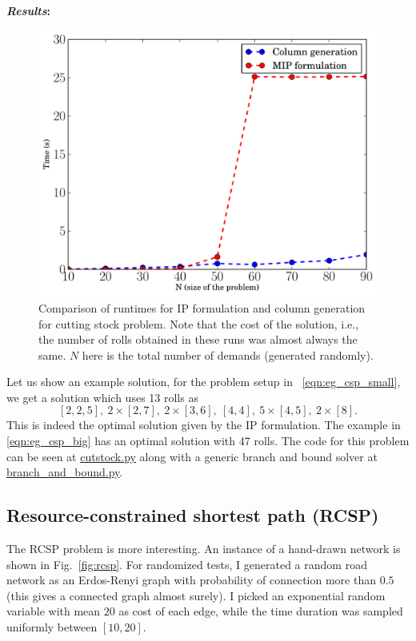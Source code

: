 \documentclass[letterpaper, 10pt, twocolumn, reqno]{amsart}
\begin{document}
\textbf{\emph{Results}:}
\begin{figure}
\centering
\includegraphics[width=0.9 \columnwidth]{colgen_results}
\caption{Comparison of runtimes for IP formulation and column generation for cutting stock problem. Note that the cost of the solution, i.e., the number of
rolls obtained in these runs was almost always the same. $N$ here is the total number of demands (generated randomly).}
\label{fig:csp_average_runtime}
\end{figure}

Let us show an example solution, for the problem setup in ~\eqref{eqn:eg_csp_small}, we get a solution which uses 13 rolls as
$$
[2,2,5],\ 2\times [2,7],\ 2 \times [3,6],\ [4,4],\ 5 \times [4,5],\ 2\times [8].
$$
This is indeed the optimal solution given by the IP formulation. The example in \eqref{eqn:eg_csp_big} has an optimal solution with 47 rolls. The code for
this problem can be seen at \href{https://github.com/pratikac/16.763/blob/master/extensions/column_generation/cutstock.py}{cutstock.py}
along with a generic branch and bound solver at
\href{https://github.com/pratikac/16.763/blob/master/extensions/column_generation/branch\_and\_bound.py}{branch\_and\_bound.py}.

\subsection{Resource-constrained shortest path (RCSP)}
\label{ssec:eg_shortest_path}

The RCSP problem is more interesting. An instance of a hand-drawn network is shown in Fig.~\ref{fig:rcsp}. For randomized tests, I generated a random road network as an Erdos-Renyi graph with probability of connection more than $0.5$ (this gives a connected graph almost surely). I picked an exponential random variable with mean $20$ as cost of each edge, while the time duration was sampled uniformly between $[10,20]$.
\end{document}
